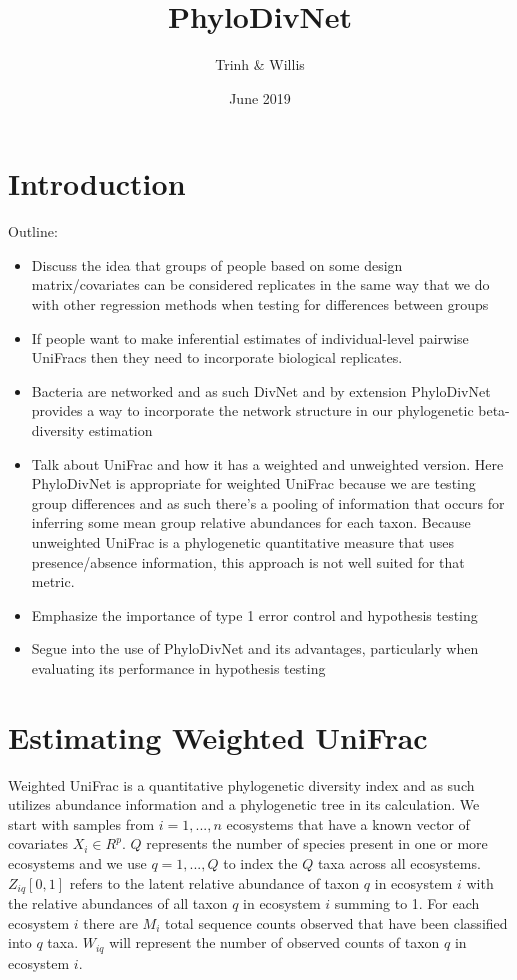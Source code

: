 \documentclass{article}
\title{PhyloDivNet}
\author{Trinh & Willis}
\date{June 2019}
\begin{document}
\maketitle
\section{Introduction}
Outline:
\begin{itemize}
  \item  Discuss the idea that groups of people based on some design matrix/covariates can be considered replicates in the same way that we do with other regression methods when testing for differences between groups
  \item  If people want to make inferential estimates of individual-level pairwise UniFracs then they need to incorporate biological replicates.
  \item  Bacteria are networked and as such DivNet and by extension PhyloDivNet provides a way to incorporate the network structure in our phylogenetic beta-diversity estimation
  \item  Talk about UniFrac and how it has a weighted and unweighted version. Here PhyloDivNet is appropriate for weighted UniFrac because we are testing group differences and as such there's a pooling of information that occurs for inferring some mean group relative abundances for each taxon. Because unweighted UniFrac is a phylogenetic quantitative measure that uses presence/absence information, this approach is not well suited for that metric.
  \item  Emphasize the importance of type 1 error control and hypothesis testing
  \item  Segue into the use of PhyloDivNet and its advantages, particularly when evaluating its performance in hypothesis testing
\end{itemize}


\section{Estimating Weighted UniFrac}

Weighted UniFrac is a quantitative phylogenetic diversity index and as such utilizes abundance information and a phylogenetic tree in its calculation. We start with samples from $i = 1,..., n$ ecosystems that have a known vector of covariates $X_i \in R^p$. $Q$ represents the number of species present in one or more ecosystems and we use $q = 1,...,Q$ to index the $Q$ taxa across all ecosystems. $Z_{iq} [0,1]$ refers to the latent relative abundance of taxon $q$ in ecosystem $i$ with the relative abundances of all taxon $q$ in ecosystem $i$ summing to 1. For each ecosystem $i$ there are $M_i$ total sequence counts observed that have been classified into $q$ taxa. $W_{iq}$ will represent the number of observed counts of taxon $q$ in ecosystem $i$.
\end{document}
